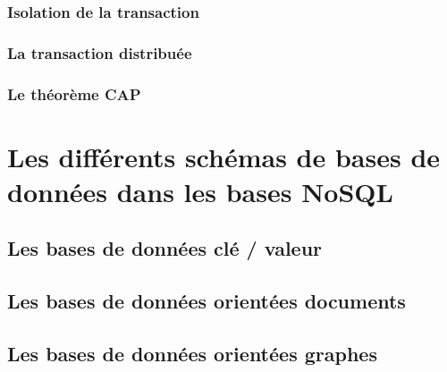 \documentclass[12pt,titlepage,a4paper]{report}
\begin{document}
			\subsection{Isolation de la transaction}
			\subsection{La transaction distribuée}
			\subsection{Le théorème CAP}

	\chapter{Les différents schémas de bases de données dans les bases NoSQL}
	\minitoc

		\section{Les bases de données clé / valeur}
			

		\section{Les bases de données orientées documents}
		\section{Les bases de données orientées graphes}
	
	
	
\end{document}

